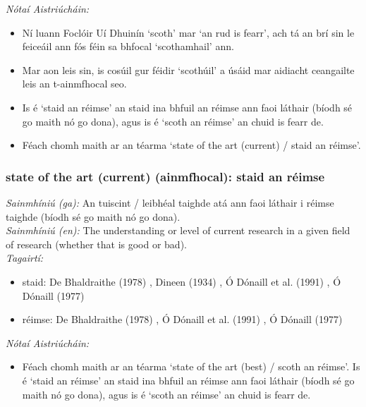  \noindent \textit{Nótaí Aistriúcháin:}
\begin{itemize}
	\item Ní luann Foclóir Uí Dhuinín `scoth' mar `an rud is fearr', ach tá an brí sin le feiceáil ann fós féin sa bhfocal `scothamhail' ann.
	\item Mar aon leis sin, is cosúil gur féidir `scothúil' a úsáid mar aidiacht ceangailte leis an t-ainmfhocal seo.
	\item Is é `staid an réimse' an staid ina bhfuil an réimse ann faoi láthair (bíodh sé go maith nó go dona), agus is é `scoth an réimse' an chuid is fearr de.
	\item Féach chomh maith ar an téarma `state of the art (current) / staid an réimse'.
\end{itemize}


\subsubsection*{state of the art (current) (ainmfhocal): staid an réimse}
 \noindent \textit{Sainmhíniú (ga):} An tuiscint / leibhéal taighde atá ann faoi láthair i réimse taighde (bíodh sé go maith nó go dona).
\\
 \noindent \textit{Sainmhíniú (en):} The understanding or level of current research in a given field of research (whether that is good or bad).
\\
 \noindent \textit{Tagairtí:}
\begin{itemize}
	\item staid: De Bhaldraithe (1978) \cite{de-bhaldraithe}, Dineen (1934) \cite{dineen}, Ó Dónaill et al. (1991) \cite{focloir-beag}, Ó Dónaill (1977) \cite{odonaill}
	\item réimse: De Bhaldraithe (1978) \cite{de-bhaldraithe}, Ó Dónaill et al. (1991) \cite{focloir-beag}, Ó Dónaill (1977) \cite{odonaill}
\end{itemize}

 \noindent \textit{Nótaí Aistriúcháin:}
\begin{itemize}
	\item Féach chomh maith ar an téarma `state of the art (best) / scoth an réimse'. Is é `staid an réimse' an staid ina bhfuil an réimse ann faoi láthair (bíodh sé go maith nó go dona), agus is é `scoth an réimse' an chuid is fearr de.
\end{itemize}


